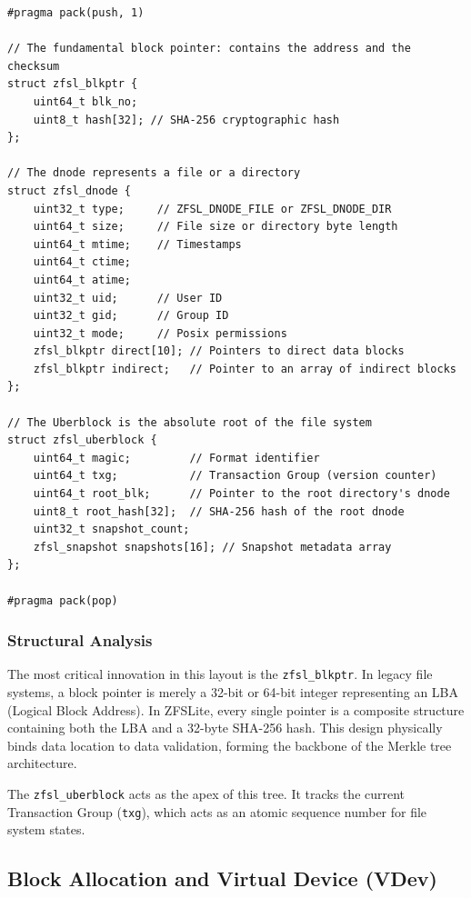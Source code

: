 \documentclass[pdflatex,sn-mathphys-num]{sn-jnl}
\begin{document}
\begin{lstlisting}[caption={Core on-disk structures defining the ZFSLite layout.}, label={lst:structs}]
#pragma pack(push, 1)

// The fundamental block pointer: contains the address and the checksum
struct zfsl_blkptr {
    uint64_t blk_no;
    uint8_t hash[32]; // SHA-256 cryptographic hash
};

// The dnode represents a file or a directory
struct zfsl_dnode {
    uint32_t type;     // ZFSL_DNODE_FILE or ZFSL_DNODE_DIR
    uint64_t size;     // File size or directory byte length
    uint64_t mtime;    // Timestamps
    uint64_t ctime;
    uint64_t atime;
    uint32_t uid;      // User ID
    uint32_t gid;      // Group ID
    uint32_t mode;     // Posix permissions
    zfsl_blkptr direct[10]; // Pointers to direct data blocks
    zfsl_blkptr indirect;   // Pointer to an array of indirect blocks
};

// The Uberblock is the absolute root of the file system
struct zfsl_uberblock {
    uint64_t magic;         // Format identifier
    uint64_t txg;           // Transaction Group (version counter)
    uint64_t root_blk;      // Pointer to the root directory's dnode
    uint8_t root_hash[32];  // SHA-256 hash of the root dnode
    uint32_t snapshot_count;
    zfsl_snapshot snapshots[16]; // Snapshot metadata array
};

#pragma pack(pop)
\end{lstlisting}

\subsubsection{Structural Analysis}
The most critical innovation in this layout is the \verb+zfsl_blkptr+. In legacy file systems, a block pointer is merely a 32-bit or 64-bit integer representing an LBA (Logical Block Address). In ZFSLite, every single pointer is a composite structure containing both the LBA and a 32-byte SHA-256 hash. This design physically binds data location to data validation, forming the backbone of the Merkle tree architecture. 

The \verb+zfsl_uberblock+ acts as the apex of this tree. It tracks the current Transaction Group (\verb+txg+), which acts as an atomic sequence number for file system states.

\subsection{Block Allocation and Virtual Device (VDev)}
\end{document}
